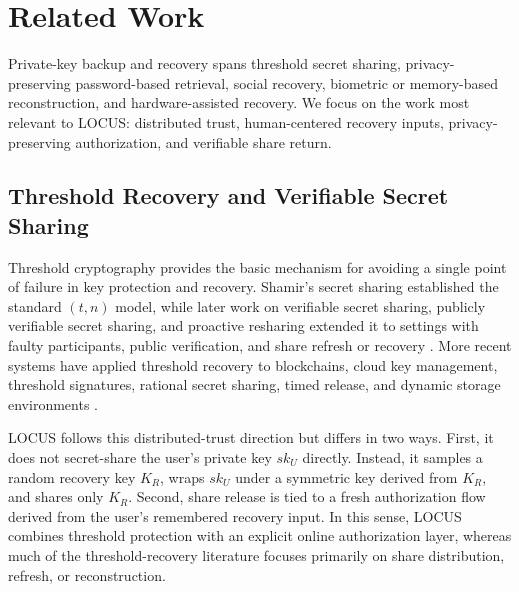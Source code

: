 \section{Related Work}
\label{sec:related}

Private-key backup and recovery spans threshold secret sharing, privacy-preserving password-based retrieval, social recovery, biometric or memory-based reconstruction, and hardware-assisted recovery. We focus on the work most relevant to \textsf{LOCUS}: distributed trust, human-centered recovery inputs, privacy-preserving authorization, and verifiable share return.

\subsection{Threshold Recovery and Verifiable Secret Sharing}

Threshold cryptography provides the basic mechanism for avoiding a single point of failure in key protection and recovery. Shamir's secret sharing established the standard \((t,n)\) model, while later work on verifiable secret sharing, publicly verifiable secret sharing, and proactive resharing extended it to settings with faulty participants, public verification, and share refresh or recovery \cite{Shamir1979,Feldman1987,PVSS1999,AVSS2002}. More recent systems have applied threshold recovery to blockchains, cloud key management, threshold signatures, rational secret sharing, timed release, and dynamic storage environments \cite{ConsortiumBlockchain2021,CloudKMS2021,ThresholdECDSARecovery2022,RandomBeaconRecovery2022,HierarchicalStorage2023,RationalSecretSharing2024,PRTDR2024}.

\textsf{LOCUS} follows this distributed-trust direction but differs in two ways. First, it does not secret-share the user's private key \(sk_U\) directly. Instead, it samples a random recovery key \(K_R\), wraps \(sk_U\) under a symmetric key derived from \(K_R\), and shares only \(K_R\). Second, share release is tied to a fresh authorization flow derived from the user's remembered recovery input. In this sense, \textsf{LOCUS} combines threshold protection with an explicit online authorization layer, whereas much of the threshold-recovery literature focuses primarily on share distribution, refresh, or reconstruction.

